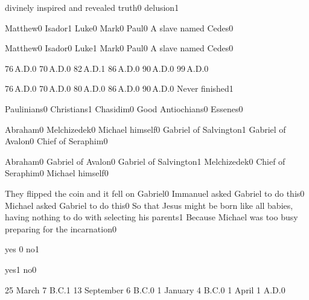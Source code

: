 
{divinely inspired and revealed truth}{0}
{delusion}{1}
\qstop

{Matthew}{0}
{Isador}{1}
{Luke}{0}
{Mark}{0}
{Paul}{0}
{A slave named Cedes}{0}
\qstop

{Matthew}{0}
{Isador}{0}
{Luke}{1}
{Mark}{0}
{Paul}{0}
{A slave named Cedes}{0}
\qstop

{76\,A.D.}{0}
{70\,A.D.}{0}
{82\,A.D.}{1}
{86\,A.D.}{0}
{90\,A.D.}{0}
{99\,A.D.}{0}
\qstop

{76\,A.D.}{0}
{70\,A.D.}{0}
{80\,A.D.}{0}
{86\,A.D.}{0}
{90\,A.D.}{0}
{Never finished}{1}
\qstop

{Paulinians}{0}
{Christians}{1}
{Chasidim}{0}
{Good Antiochians}{0}
{Essenes}{0}
\qstop


{Abraham}{0}
{Melchizedek}{0}
{Michael himself}{0}
{Gabriel of Salvington}{1}
{Gabriel of Avalon}{0}
{Chief of Seraphim}{0}
\qstop

{Abraham}{0}
{Gabriel of Avalon}{0}
{Gabriel of Salvington}{1}
{Melchizedek}{0}
{Chief of Seraphim}{0}
{Michael himself}{0}
\qstop

{They flipped the coin and it fell on Gabriel}{0}
{Immanuel asked Gabriel to do this}{0}
{Michael asked Gabriel to do this}{0}
{So that Jesus might be born like all babies, having nothing to do with selecting his parents}{1}
{Because Michael was too busy preparing for the incarnation}{0}
\qstop

{yes }{0}
{no}{1}
\qstop

{yes}{1}
{no}{0}
\qstop

{25 March 7 B.C.}{1}
{13 September 6 B.C.}{0}
{1 January 4 B.C.}{0}
{1 April 1 A.D.}{0}
\qstop

